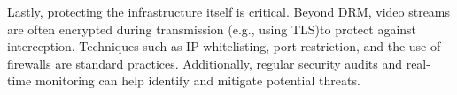 Lastly, protecting the infrastructure itself is critical. Beyond DRM, video streams are often encrypted during transmission (e.g., using \ac{TLS})to protect against interception. Techniques such as IP whitelisting, port restriction, and the use of firewalls are standard practices. Additionally, regular security audits and real-time monitoring can help identify and mitigate potential threats.





